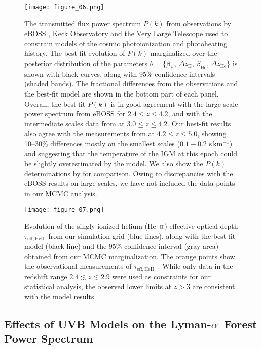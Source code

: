 \documentclass[twocolumn]{aastex62}
\newcommand\Lya{Lyman-$\alpha$}
\def\HeII{\hbox{He~$\scriptstyle\rm II$}}
\newcommand\taueffHe{$\tau_{\mathrm{eff,HeII}}$~}
\begin{document}
\begin{figure*}
\texttt{[image: figure\_06.png]}
\caption{The transmitted flux power spectrum $P(k)$ 
from observations by eBOSS \citep{Chabanier+2019}, Keck Observatory and the Very Large Telescope \citep{Irsic+2017a, boera2019a} 
used to constrain models of the cosmic photoionization and photoheating history. 
The best-fit evolution of $P(k)$ marginalized over the posterior distribution of the parameters $\theta= \{ \beta_{\mathrm{H}}, \,\Delta z_{\mathrm{H}}, \, \beta_{\mathrm{He}}, \,\Delta z_{\mathrm{He}}\}$ is shown with black curves, along 
with 95\% confidence intervals (shaded bands). 
The fractional differences from the observations and the best-fit model are shown in the bottom part of each panel.
Overall, the best-fit $P(k)$ is in good agreement with the large-scale power spectrum from eBOSS for $2.4 \leq z \leq 4.2$, 
and with the intermediate scales data from \cite{Irsic+2017a} at $3.0 \leq z \leq 4.2$. 
Our best-fit results also agree with the measurements from \cite{boera2019a} at  $4.2 \leq z \leq 5.0$, showing 10--30\% differences mostly on the smallest scales ($0.1 - 0.2\,\, \mathrm{s\, km^{-1}}$) and suggesting that the temperature of the IGM at this epoch could be slightly overestimated by 
the model. We also show the $P(k)$ determinations by \cite{walther2018a} for comparison.
Owing to discrepancies with the eBOSS results on large scales, we have not included the \cite{walther2018a} data points in our MCMC analysis.}
\label{fig:power_spectrum_all}
\end{figure*}

\begin{figure}
\texttt{[image: figure\_07.png]}
\caption{Evolution of the singly ionized helium (\HeII) effective optical depth \taueffHe from our simulation grid (blue lines), along with the best-fit model (black line) and the 95\% 
confidence interval (gray area) obtained from our MCMC marginalization.
The orange points show the observational measurements of \taueffHe \citep{Worseck+2019}. While only data in the redshift 
range $2.4 \lesssim z \lesssim 2.9$ were used as constraints for our statistical analysis, the
observed lower limits at $z > 3$ are  consistent with the model results.}
\label{fig:tau_HeII}
\end{figure}

\subsection{Effects of UVB Models on the \Lya\ Forest Power Spectrum}
\end{document}
